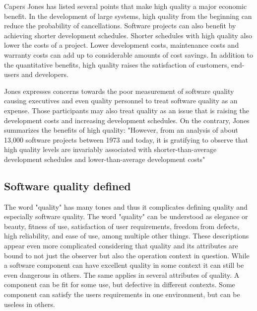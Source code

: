 Capers Jones has listed several points that make high quality a major economic benefit. In the development of large systems, high quality from the beginning can reduce the probability of cancellations. Software projects can also benefit by achieving shorter development schedules. Shorter schedules with high quality also lower the costs of a project. Lower development costs, maintenance costs and warranty costs can add up to considerable amounts of cost savings. In addition to the quantitative benefits, high quality raises the satisfaction of customers, end-users and developers. 

Jones expresses concerns towards the poor measurement of software quality causing executives and even quality personnel to treat software quality as an expense. Those participants may also treat quality as an issue that is raising the development costs and increasing development schedules. On the contrary, Jones summarizes the benefits of high quality: "However, from an analysis of about 13,000 software projects between 1973 and today, it is gratifying to observe that high quality levels are invariably associated with shorter-than-average development schedules and lower-than-average development costs"~\cite{jones2011economics}

 

\subsection{Software quality defined}

The word "quality" has many tones and thus it complicates defining quality and especially software quality. The word "quality" can be understood as elegance or beauty, fitness of use, satisfaction of user requirements, freedom from defects, high reliability, and ease of use, among multiple other things. These descriptions appear even more complicated considering that quality and its attributes are bound to not just the observer but also the operation context in question. While a software component can have excellent quality in some context it can still be even dangerous in others. The same applies in several attributes of quality. A component can be fit for some use, but defective in different contexts. Some component can satisfy the users requirements in one environment, but can be useless in others.~\cite{jones2011economics}

